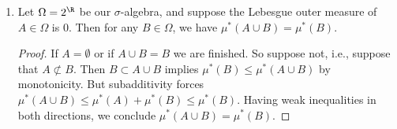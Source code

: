 \documentclass[onesided]{ccg-pset}
\begin{document}
\begin{enumerate}
\begin{proof}
\end{proof}
\item Let $\Omega = 2^\R$ be our $\sigma$-algebra, and suppose the Lebesgue outer measure of $A \in \Omega$ is $0$. Then for any $B \in \Omega$, we have $\mu^*(A\cup B) = \mu^*(B)$.
    \begin{proof}
        If $A = \emptyset$ or if $A \cup B = B$ we are finished. So suppose not, i.e., suppose that $A \not\subset B$. Then $B \subset A \cup B$ implies $\mu^*(B) \le \mu^*(A \cup B)$ by monotonicity. But subadditivity forces $\mu^*(A \cup B) \le \mu^*(A) + \mu^*(B) \le \mu^*(B)$. Having weak inequalities in both directions, we conclude $\mu^*(A \cup B) = \mu^*(B)$.
    \end{proof}
\end{enumerate}



\end{document}
